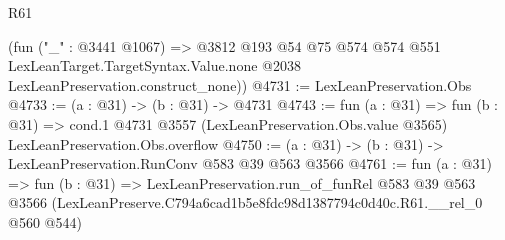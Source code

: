 \begin{lexlean}{R61}
\begin{coremodule}
      (fun ("_" : @3441 @1067) =>
      @3812
        @193
        @54
        @75
        @574
        @574
        @551
        LexLeanTarget.TargetSyntax.Value.none
        @2038
        LexLeanPreservation.construct_none))
@4731 := LexLeanPreservation.Obs
@4733 := (a : @31) -> (b : @31) -> @4731
@4743 := fun (a : @31) =>
  fun (b : @31) =>
  cond.{1} @4731 @3557 (LexLeanPreservation.Obs.value @3565) LexLeanPreservation.Obs.overflow
@4750 := (a : @31) -> (b : @31) -> LexLeanPreservation.RunConv @583 @39 @563 @3566
@4761 := fun (a : @31) =>
  fun (b : @31) =>
  LexLeanPreservation.run_of_funRel
    @583
    @39
    @563
    @3566
    (LexLeanPreserve.C794a6cad1b5e8fdc98d1387794c0d40c.R61.__rel_0 @560 @544)
\end{coremodule}
\end{lexlean}
